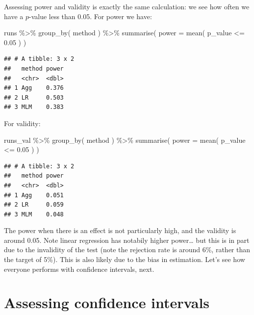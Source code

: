 \documentclass[
]{book}
\newenvironment{Shaded}{\begin{snugshade}}{\end{snugshade}}
\newcommand{\AttributeTok}[1]{\textcolor[rgb]{0.77,0.63,0.00}{#1}}
\newcommand{\FloatTok}[1]{\textcolor[rgb]{0.00,0.00,0.81}{#1}}
\newcommand{\FunctionTok}[1]{\textcolor[rgb]{0.00,0.00,0.00}{#1}}
\newcommand{\NormalTok}[1]{#1}
\newcommand{\SpecialCharTok}[1]{\textcolor[rgb]{0.00,0.00,0.00}{#1}}
\begin{document}
Assessing power and validity is exactly the same calculation: we see how often we have a \(p\)-value less than 0.05.
For power we have:

\begin{Shaded}
\begin{Highlighting}[]
\NormalTok{runs }\SpecialCharTok{\%\textgreater{}\%} \FunctionTok{group\_by}\NormalTok{( method ) }\SpecialCharTok{\%\textgreater{}\%}
  \FunctionTok{summarise}\NormalTok{( }\AttributeTok{power =} \FunctionTok{mean}\NormalTok{( p\_value }\SpecialCharTok{\textless{}=} \FloatTok{0.05}\NormalTok{ ) )}
\end{Highlighting}
\end{Shaded}

\begin{verbatim}
## # A tibble: 3 x 2
##   method power
##   <chr>  <dbl>
## 1 Agg    0.376
## 2 LR     0.503
## 3 MLM    0.383
\end{verbatim}

For validity:

\begin{Shaded}
\begin{Highlighting}[]
\NormalTok{runs\_val }\SpecialCharTok{\%\textgreater{}\%} \FunctionTok{group\_by}\NormalTok{( method ) }\SpecialCharTok{\%\textgreater{}\%}
  \FunctionTok{summarise}\NormalTok{( }\AttributeTok{power =} \FunctionTok{mean}\NormalTok{( p\_value }\SpecialCharTok{\textless{}=} \FloatTok{0.05}\NormalTok{ ) )}
\end{Highlighting}
\end{Shaded}

\begin{verbatim}
## # A tibble: 3 x 2
##   method power
##   <chr>  <dbl>
## 1 Agg    0.051
## 2 LR     0.059
## 3 MLM    0.048
\end{verbatim}

The power when there is an effect is not particularly high, and the validity is around 0.05.
Note linear regression has notabily higher power\ldots{} but this is in part due to the invalidity of the test (note the rejection rate is around 6\%, rather than the target of 5\%).
This is also likely due to the bias in estimation.
Let's see how everyone performs with confidence intervals, next.

\hypertarget{assessing-confidence-intervals}{%
\section{Assessing confidence intervals}\label{assessing-confidence-intervals}}
\end{document}
